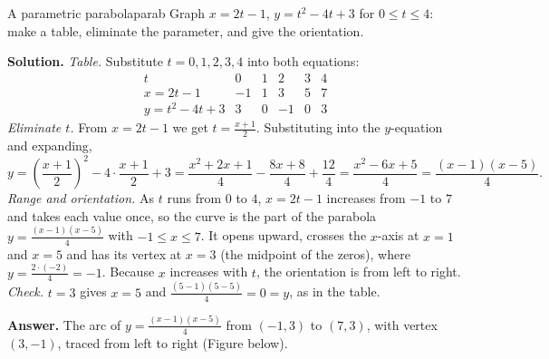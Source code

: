 \documentclass[11pt]{article}
\begin{document}
\begin{exmp}{A parametric parabola}{parab}
Graph $x=2t-1$, $y=t^2-4t+3$ for $0\le t\le4$: make a table, eliminate the parameter, and give the orientation.

\textbf{Solution.} \emph{Table.} Substitute $t=0,1,2,3,4$ into both equations:
\[
\begin{array}{c|ccccc}
t & 0 & 1 & 2 & 3 & 4\\\hline
x=2t-1 & -1 & 1 & 3 & 5 & 7\\
y=t^2-4t+3 & 3 & 0 & -1 & 0 & 3
\end{array}
\]
\emph{Eliminate $t$.} From $x=2t-1$ we get $t=\frac{x+1}2$. Substituting into the $y$-equation and expanding,
\[
y=\left(\frac{x+1}2\right)^2-4\cdot\frac{x+1}2+3=\frac{x^2+2x+1}4-\frac{8x+8}4+\frac{12}4=\frac{x^2-6x+5}4=\frac{(x-1)(x-5)}4.
\]
\emph{Range and orientation.} As $t$ runs from $0$ to $4$, $x=2t-1$ increases from $-1$ to $7$ and takes each value once, so the curve is the part of the parabola $y=\frac{(x-1)(x-5)}4$ with $-1\le x\le7$. It opens upward, crosses the $x$-axis at $x=1$ and $x=5$ and has its vertex at $x=3$ (the midpoint of the zeros), where $y=\frac{2\cdot(-2)}4=-1$. Because $x$ increases with $t$, the orientation is from left to right. \emph{Check.} $t=3$ gives $x=5$ and $\frac{(5-1)(5-5)}4=0=y$, as in the table.

\textbf{Answer.} The arc of $y=\frac{(x-1)(x-5)}4$ from $(-1,3)$ to $(7,3)$, with vertex $(3,-1)$, traced from left to right (Figure below).
\end{exmp}
\end{document}
